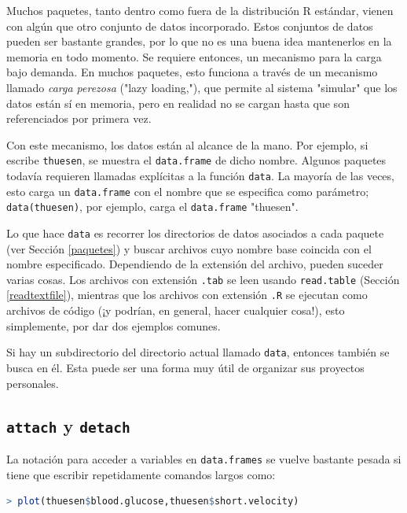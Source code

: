 Muchos paquetes, tanto dentro como fuera de la distribución R estándar, vienen
con algún que otro conjunto de datos incorporado. Estos conjuntos de datos
pueden ser bastante grandes, por lo que no es una buena idea mantenerlos en la
memoria en todo momento. Se requiere entonces, un mecanismo para la carga bajo
demanda. En muchos paquetes, esto funciona a través de un mecanismo llamado
\textit{carga perezosa} ("lazy loading,"), que permite al sistema "simular" que
los datos están sí  en memoria, pero en realidad no se cargan hasta que son
referenciados por primera vez.

Con este mecanismo, los datos están al alcance de la mano. Por ejemplo, si
escribe \texttt{thuesen}, se muestra el \texttt{data.frame} de dicho nombre.
Algunos paquetes todavía requieren llamadas explícitas a la función
\texttt{data}.  La mayoría de las veces, esto carga un \texttt{data.frame} con
el nombre que se especifica como parámetro; \texttt{data(thuesen)}, por
ejemplo, carga el \texttt{data.frame} "thuesen".

Lo que hace \texttt{data} es recorrer los directorios de datos asociados a cada
paquete (ver Sección \ref{paquetes}) y buscar archivos cuyo nombre base
coincida con el nombre especificado. Dependiendo de la extensión del archivo,
pueden suceder varias cosas. Los archivos con extensión \texttt{.tab} se leen
usando \texttt{read.table} (Sección \ref{readtextfile}), mientras que los
archivos con extensión \texttt{.R} se ejecutan como archivos de código (¡y
podrían, en general, hacer cualquier cosa!), esto simplemente, por dar dos
ejemplos comunes.

Si hay un subdirectorio del directorio actual llamado \texttt{data}, entonces
también se busca en él. Esta puede ser una forma muy útil de organizar sus
proyectos personales.

\subsection{\texttt{attach} y \texttt{detach}}\label{attachdetach}

La notación para acceder a variables en \texttt{data.frames} se vuelve bastante pesada
si tiene que escribir repetidamente comandos largos como:

\begin{lstlisting}[language=R]
> plot(thuesen$blood.glucose,thuesen$short.velocity)
\end{lstlisting}

